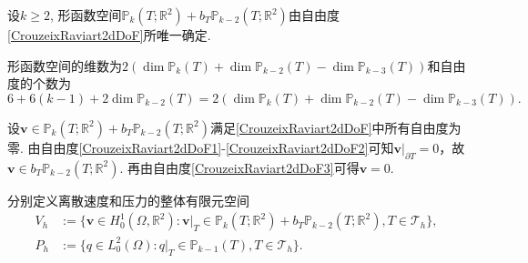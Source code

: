 \begin{lemma}
设$k\geq2$, 形函数空间$\mathbb P_k(T;\mathbb R^2)+b_T\mathbb P_{k-2}(T;\mathbb R^2)$由自由度\eqref{CrouzeixRaviart2dDoF}所唯一确定.
\end{lemma}
\begin{prf}
形函数空间的维数为$2(\dim\mathbb P_k(T)+\dim\mathbb P_{k-2}(T)-\dim\mathbb P_{k-3}(T))$和自由度的个数为
\begin{equation*}
6+6(k-1)+2\dim\mathbb P_{k-2}(T)=2(\dim\mathbb P_k(T)+\dim\mathbb P_{k-2}(T)-\dim\mathbb P_{k-3}(T)).
\end{equation*} 

设$\boldsymbol{v}\in\mathbb P_k(T;\mathbb R^2)+b_T\mathbb P_{k-2}(T;\mathbb R^2)$满足\eqref{CrouzeixRaviart2dDoF}中所有自由度为零. 由自由度\eqref{CrouzeixRaviart2dDoF1}-\eqref{CrouzeixRaviart2dDoF2}可知$\boldsymbol{v}|_{\partial T}=0$，故$\boldsymbol{v}\in b_T\mathbb P_{k-2}(T;\mathbb R^2)$. 再由自由度\eqref{CrouzeixRaviart2dDoF3}可得$\boldsymbol{v}=0$.
\end{prf}

分别定义离散速度和压力的整体有限元空间
\begin{align*}
 V_{h}&:=\{\boldsymbol{v}\in H_{0}^{1}(\Omega,\mathbb{R}^{2}): \boldsymbol{v}|_T\in \mathbb P_k(T;\mathbb R^2)+b_T\mathbb P_{k-2}(T;\mathbb R^2), T\in \mathcal{T}_h\},
\\
P_{h}&:=\{q\in L_{0}^2(\Omega): q|_T\in \mathbb P_{k-1}(T), T\in \mathcal{T}_h\}.
\end{align*}

